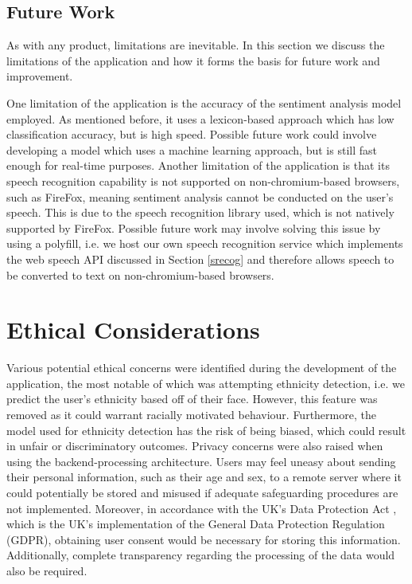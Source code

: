 \documentclass[12pt, a4paper]{article}
\newcommand{\np}
    {
    \vskip 0.4cm
    }
\begin{document}
\subsection{Future Work}
\label{fw}
As with any product, limitations are inevitable. In this section we discuss the limitations of the application and how it forms the basis for future work and improvement.
\np
One limitation of the application is the accuracy of the sentiment analysis model employed. As mentioned before, it uses a lexicon-based approach which has low classification accuracy, but is high speed. Possible future work could involve developing a model which uses a machine learning approach, but is still fast enough for real-time purposes. Another limitation of the application is that its speech recognition capability is not supported on non-chromium-based browsers, such as FireFox, meaning sentiment analysis cannot be conducted on the user's speech. This is due to the speech recognition library used, which is not natively supported by FireFox. Possible future work may involve solving this issue by using a polyfill, i.e. we host our own speech recognition service which implements the web speech API discussed in Section \ref{srecog} and therefore allows speech to be converted to text on non-chromium-based browsers.



\section{Ethical Considerations}
\label{lsepi}

Various potential ethical concerns were identified during the development of the application, the most notable of which was attempting ethnicity detection, i.e. we predict the user's ethnicity based off of their face. However, this feature was removed as it could warrant racially motivated behaviour. Furthermore, the model used for ethnicity detection has the risk of being biased, which could result in unfair or discriminatory outcomes. Privacy concerns were also raised when using the backend-processing architecture. Users may feel uneasy about sending their personal information, such as their age and sex, to a remote server where it could potentially be stored and misused if adequate safeguarding procedures are not implemented. Moreover, in accordance with the UK's Data Protection Act \citep{dpa}, which is the UK's implementation of the General Data Protection Regulation (GDPR), obtaining user consent would be necessary for storing this information. Additionally, complete transparency regarding the processing of the data would also be required.
\end{document}
